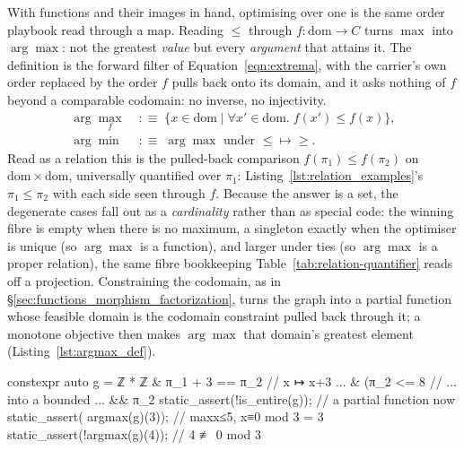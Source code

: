 \documentclass[11pt, a4paper]{article}
\begin{document}
With functions and their images in hand, optimising over one is the same order playbook read through a map.
Reading $\le$ through $f\colon \mathrm{dom}\to C$ turns $\max$ into $\arg\max$: not the greatest \emph{value} but every \emph{argument} that attains it.
The definition is the forward filter of Equation~\ref{eqn:extrema}, with the carrier's own order replaced by the order $f$ pulls back onto its domain, and it asks nothing of $f$ beyond a comparable codomain: no inverse, no injectivity.
\begin{equation}
\label{eqn:argmax}
\begin{aligned}
\arg\max_{f} &\;:\equiv\; \{x \in \mathrm{dom} \mid \forall x' \in \mathrm{dom}.\; f(x') \le f(x)\},\\
\arg\min &\;:\equiv\; \arg\max \text{ under } {\le}\mapsto{\ge}.
\end{aligned}
\end{equation}
Read as a relation this is the pulled-back comparison $f(\pi_1) \le f(\pi_2)$ on $\mathrm{dom}\times\mathrm{dom}$, universally quantified over $\pi_1$: Listing~\ref{lst:relation_examples}'s $\pi_1 \le \pi_2$ with each side seen through $f$.
Because the answer is a set, the degenerate cases fall out as a \emph{cardinality} rather than as special code: the winning fibre is empty when there is no maximum, a singleton exactly when the optimiser is unique (so $\arg\max$ is a function), and larger under ties (so $\arg\max$ is a proper relation), the same fibre bookkeeping Table~\ref{tab:relation-quantifier} reads off a projection.
Constraining the codomain, as in §\ref{sec:functions_morphism_factorization}, turns the graph into a partial function whose feasible domain is the codomain constraint pulled back through it; a monotone objective then makes $\arg\max$ that domain's greatest element (Listing~\ref{lst:argmax_def}).

\begin{listing}[htbp]
\caption{$\arg\max$ over a \emph{partial function}: a compile-time constrained optimum.
Constraining the codomain of the graph $x \mapsto x+3$, bounded ($\pi_2 \le 8$) and restricted to a residue class ($\pi_2 \equiv 0 \bmod 3$), drops \emph{entire} but keeps \emph{functional} (Table~\ref{tab:relation-quantifier}): the same graph is now a partial function.
Its feasible domain is that codomain constraint pulled back through the graph, $\{x \le 5 \wedge x \equiv 0 \bmod 3\}$, and because a translation is monotone $\arg\max$ is that domain's greatest element, $3$, read off structurally with no search.}
\label{lst:argmax_def}
\begin{cpp}
constexpr auto g = ℤ * ℤ & π_1 + 3 == π_2   // x ↦ x+3 ...
                     & (π_2 <= 8             //   ... into a bounded ...
                        && π_2 %
static_assert(!is_entire(g));                       // a partial function now
static_assert( argmax(g)(3));                       // max{x≤5, x≡0 mod 3} = 3
static_assert(!argmax(g)(4));                        // 4 ≢ 0 mod 3
\end{cpp}
\end{listing}
\end{document}
